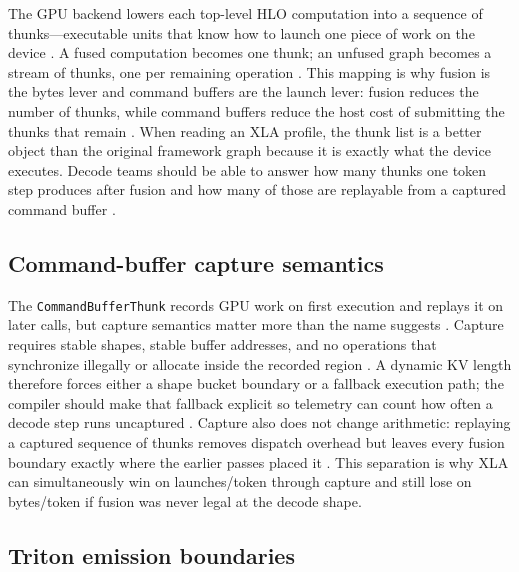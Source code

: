 The GPU backend lowers each top-level HLO computation into a sequence of thunks---executable units that know how to launch one piece of work on the device \citep{openxla2024}. A fused computation becomes one thunk; an unfused graph becomes a stream of thunks, one per remaining operation \citep{openxla2024,taxbreak2026}. This mapping is why fusion is the bytes lever and command buffers are the launch lever: fusion reduces the number of thunks, while command buffers reduce the host cost of submitting the thunks that remain \citep{memoryfloor2026,nvidia2024cudagraphs}. When reading an XLA profile, the thunk list is a better object than the original framework graph because it is exactly what the device executes. Decode teams should be able to answer how many thunks one token step produces after fusion and how many of those are replayable from a captured command buffer \citep{patel2025llminference,chen2020compilerbasedhardw}.

\subsection{Command-buffer capture semantics}

The \texttt{CommandBufferThunk} records GPU work on first execution and replays it on later calls, but capture semantics matter more than the name suggests \citep{openxla2024,nvidia2024cudagraphs}. Capture requires stable shapes, stable buffer addresses, and no operations that synchronize illegally or allocate inside the recorded region \citep{openxla2024,memoryfloor2026}. A dynamic KV length therefore forces either a shape bucket boundary or a fallback execution path; the compiler should make that fallback explicit so telemetry can count how often a decode step runs uncaptured \citep{kwon2023vllm,patel2025llminference}. Capture also does not change arithmetic: replaying a captured sequence of thunks removes dispatch overhead but leaves every fusion boundary exactly where the earlier passes placed it \citep{nvidia2024cudagraphs,memoryfloor2026}. This separation is why XLA can simultaneously win on launches/token through capture and still lose on bytes/token if fusion was never legal at the decode shape.

\subsection{Triton emission boundaries}

